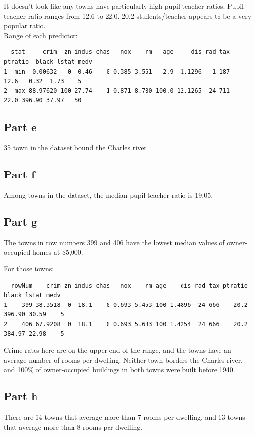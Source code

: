 \documentclass[11pt]{article}
\begin{document}
It doesn't look like any towns have particularly high pupil-teacher ratios. Pupil-teacher ratio ranges from 12.6 to 22.0. 20.2 students/teacher appears to be a very popular ratio.\\


Range of each predictor:
\begin{verbatim}
  stat     crim  zn indus chas   nox    rm   age     dis rad tax ptratio  black lstat medv
1  min  0.00632   0  0.46    0 0.385 3.561   2.9  1.1296   1 187    12.6   0.32  1.73    5
2  max 88.97620 100 27.74    1 0.871 8.780 100.0 12.1265  24 711    22.0 396.90 37.97   50
\end{verbatim}



\subsection*{Part e}

35 town in the dataset bound the Charles river

\subsection*{Part f}

Among towns in the dataset, the median pupil-teacher ratio is 19.05.

\subsection*{Part g}

The towns in row numbers 399 and 406 have the lowest median values of owner-occupied homes at \$5,000.

For those towns:
\begin{verbatim}
  rowNum    crim zn indus chas   nox    rm age    dis rad tax ptratio  black lstat medv
1    399 38.3518  0  18.1    0 0.693 5.453 100 1.4896  24 666    20.2 396.90 30.59    5
2    406 67.9208  0  18.1    0 0.693 5.683 100 1.4254  24 666    20.2 384.97 22.98    5
\end{verbatim}

Crime rates here are on the upper end of the range, and the towns have an average number of rooms per dwelling. Neither town borders the Charles river, and 100\% of owner-occupied buildings in both towns were built before 1940.

\subsection*{Part h}
There are 64 towns that average more than 7 rooms per dwelling, and 13 towns that average more than 8 rooms per dwelling.
\end{document}
